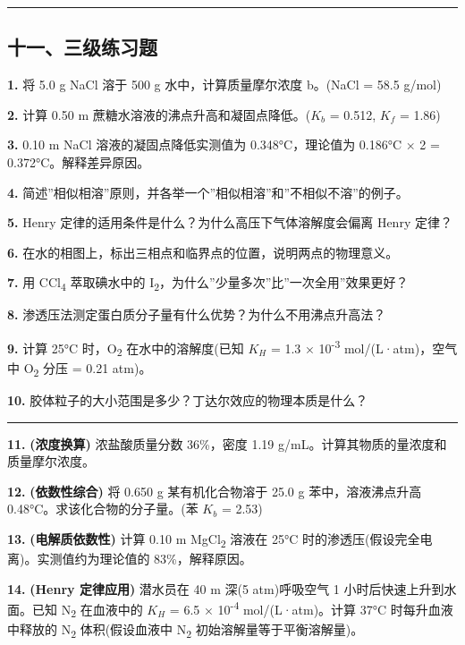 \documentclass[a4paper,11pt]{ctexart}
\newcommand{\箭}{\ensuremath{\rightarrow}}
\newcommand{\左箭}{\ensuremath{\leftarrow}}
\newcommand{\上箭}{\ensuremath{\uparrow}}
\newcommand{\下箭}{\ensuremath{\downarrow}}
\newcommand{\衡}{\ensuremath{\rightleftharpoons}}
\newcommand{\双箭}{\ensuremath{\leftrightarrow}}
\newcommand{\约等于}{\ensuremath{\approx}}
\newcommand{\小于等于}{\ensuremath{\leq}}
\newcommand{\大于等于}{\ensuremath{\geq}}
\newcommand{\不等于}{\ensuremath{\neq}}
\newcommand{\西格马}{\ensuremath{\sigma}}
\newcommand{\派}{\ensuremath{\pi}}
\begin{document}
\begin{center}\rule{0.5\linewidth}{0.5pt}\end{center}

\subsection{十一、三级练习题}\label{ux5341ux4e00ux4e09ux7ea7ux7ec3ux4e60ux9898}

\textbf{1.} 将 5.0 g NaCl 溶于 500 g 水中，计算质量摩尔浓度 b。(NaCl = 58.5 g/mol)

\textbf{2.} 计算 0.50 m 蔗糖水溶液的沸点升高和凝固点降低。(\(K_b\) = 0.512, \(K_f\) = 1.86)

\textbf{3.} 0.10 m NaCl 溶液的凝固点降低实测值为 0.348°C，理论值为 0.186°C × 2 = 0.372°C。解释差异原因。

\textbf{4.} 简述''相似相溶''原则，并各举一个''相似相溶''和''不相似不溶''的例子。

\textbf{5.} Henry 定律的适用条件是什么？为什么高压下气体溶解度会偏离 Henry 定律？

\textbf{6.} 在水的相图上，标出三相点和临界点的位置，说明两点的物理意义。

\textbf{7.} 用 CCl\textsubscript{4} 萃取碘水中的 I\textsubscript{2}，为什么''少量多次''比''一次全用''效果更好？

\textbf{8.} 渗透压法测定蛋白质分子量有什么优势？为什么不用沸点升高法？

\textbf{9.} 计算 25°C 时，O\textsubscript{2} 在水中的溶解度(已知 \(K_H\) = 1.3 × 10\textsuperscript{-3} mol/(L·atm)，空气中 O\textsubscript{2} 分压 = 0.21 atm)。

\textbf{10.} 胶体粒子的大小范围是多少？丁达尔效应的物理本质是什么？

\begin{center}\rule{0.5\linewidth}{0.5pt}\end{center}

\textbf{11.} \textbf{(浓度换算)} 浓盐酸质量分数 36\%，密度 1.19 g/mL。计算其物质的量浓度和质量摩尔浓度。

\textbf{12.} \textbf{(依数性综合)} 将 0.650 g 某有机化合物溶于 25.0 g 苯中，溶液沸点升高 0.48°C。求该化合物的分子量。(苯 \(K_b\) = 2.53)

\textbf{13.} \textbf{(电解质依数性)} 计算 0.10 m MgCl\textsubscript{2} 溶液在 25°C 时的渗透压(假设完全电离)。实测值约为理论值的 83\%，解释原因。

\textbf{14.} \textbf{(Henry 定律应用)} 潜水员在 40 m 深(5 atm)呼吸空气 1 小时后快速上升到水面。已知 N\textsubscript{2} 在血液中的 \(K_H\) = 6.5 × 10\textsuperscript{-4} mol/(L·atm)。计算 37°C 时每升血液中释放的 N\textsubscript{2} 体积(假设血液中 N\textsubscript{2} 初始溶解量等于平衡溶解量)。
\end{document}
